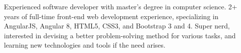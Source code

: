 

\begin{cvparagraph}

Experienced software developer with master's degree in computer science. 2+ years of full-time front-end web development experience, specializing in AngularJS, Angular 8, HTML5, CSS3, and Bootstrap 3 and 4. Super nerd, interested in devising a better problem-solving method for various tasks, and learning new technologies and tools if the need arises.
\end{cvparagraph}
